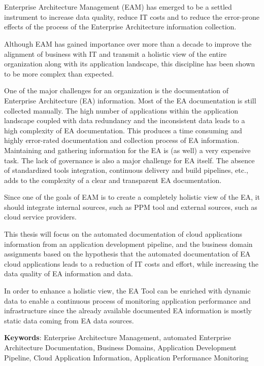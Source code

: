 \chapter{\abstractname}

Enterprise Architecture Management (EAM) has emerged to be a settled instrument to increase data quality, reduce IT costs and to reduce the error-prone effects of the process of the Enterprise Architecture information collection.

Although EAM has gained importance over more than a decade to improve the alignment of business with IT and transmit a holistic view of the entire organization along with its application landscape, this discipline has been shown to be more complex than expected.

One of the major challenges for an organization is the documentation of Enterprise Architecture (EA) information. Most of the EA documentation is still collected manually. The high number of applications within the application landscape coupled with data redundancy and the inconsistent data leads to a high complexity of EA documentation. This produces a time consuming and highly error-rated documentation and collection process of EA information. Maintaining and gathering information for the EA is (as well) a very expensive task.  The lack of governance is also a major challenge for EA itself. The absence of standardized tools integration, continuous delivery and build pipelines, etc., adds to the complexity of a clear and transparent EA documentation.

Since one of the goals of EAM is to create a completely holistic view of the EA, it should integrate internal sources, such as PPM tool and external sources, such as cloud service providers.

This thesis will focus on the automated documentation of cloud applications information from an application development pipeline, and the business domain assignments based on the hypothesis that the automated documentation of EA cloud applications leads to a reduction of IT costs and effort, while increasing the data quality of EA information and data.

In order to enhance a holistic view, the EA Tool can be enriched with dynamic data to enable a continuous process of monitoring application performance and infrastructure since the already available documented EA information is mostly static data coming from EA data sources.

\textbf{Keywords}: Enterprise Architecture Management, automated Enterprise Architecture Documentation, Business Domains, Application Development Pipeline, Cloud Application Information, Application Performance Monitoring

